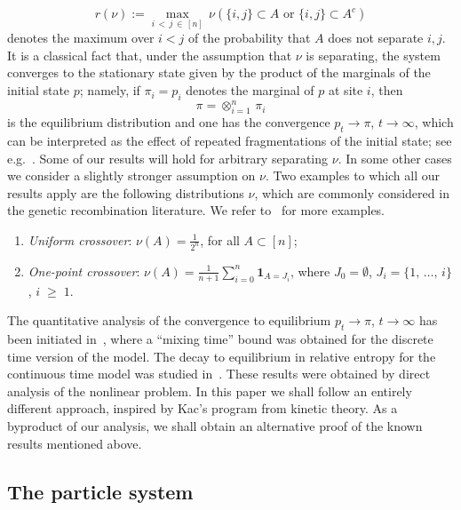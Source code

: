 \documentclass[AHL,Unicode,longabstracts,published]{cedram}
\renewcommand{\geq}{\;\geqslant\;}
\newcommand{\ind}{\mathbf{1}}
\begin{document}
\begin{equation}\label{def:rnu}
r(\nu):= \max_{i\,<\,j\,\in\,[n]}\,\nu\left(\{i,j\}\subset A \text{ or }\{i,j\}\subset A^c\right)
\end{equation}
denotes the maximum over $i<j$ of the probability that $A$ does not separate $i,j$. It is a classical fact that, under the assumption that $\nu$ is separating, the system converges to the stationary state given by the product of the marginals of the initial state $p$; namely, if $\pi_i=p_{i}$ denotes the marginal of $p$ at site $i$, then
\begin{equation}\label{station}
\pi=\otimes_{i=1}^n\,\pi_i
\end{equation}
is the equilibrium distribution and one has the convergence $p_t\to \pi$, $t\to\infty$, which can be interpreted as the effect of repeated fragmentations of the initial state; see e.g.~\cite{Sinetal2}. Some of our results will hold for arbitrary separating $\nu$. In some other cases we consider a slightly stronger assumption on $\nu$. Two examples to which all our results apply are the following distributions $\nu$, which are commonly considered in the genetic recombination literature. We refer to~\cite{entprod,Sinetal2} for more examples.
\begin{enumerate}
\item \emph{Uniform crossover}: $\nu(A)=\frac1{2^n}$, for all $A\subset[n]$;
\item \emph{One-point crossover}: $\nu(A)=\tfrac1{n+1}\sum_{i=0}^n\ind_{A=J_i} $, where $J_0=\emptyset$, $J_i=\{1,\,\dots,\,i\}$, $i\geq 1$.
\end{enumerate}

The quantitative analysis of the convergence to equilibrium $p_t\to \pi$, $t\to\infty$ has been initiated in~\cite{Sinetal2,Sinetal}, where a ``mixing time'' bound was obtained for the discrete time version of the model. The decay to equilibrium in relative entropy for the continuous time model was studied in~\cite{entprod}. These results were obtained by direct analysis of the nonlinear problem. In this paper we shall follow an entirely different approach, inspired by Kac's program from kinetic theory. As a byproduct of our analysis, we shall obtain an alternative proof of the known results mentioned above.

\subsection{The particle system}
\end{document}
